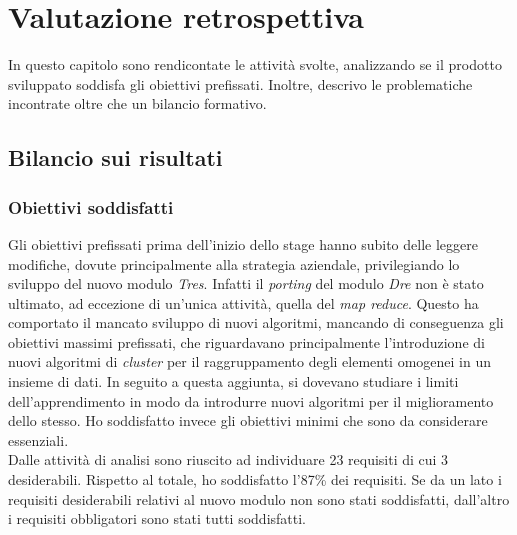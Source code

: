 
\chapter{Valutazione retrospettiva}
\label{cap:conclusioni}
In questo capitolo sono rendicontate le attività svolte, analizzando se il prodotto sviluppato soddisfa gli obiettivi prefissati. Inoltre, descrivo le problematiche incontrate oltre che un bilancio formativo.


\section{Bilancio sui risultati}

\subsection{Obiettivi soddisfatti}
Gli obiettivi prefissati prima dell'inizio dello stage hanno subito delle leggere modifiche, dovute principalmente alla strategia aziendale, privilegiando lo sviluppo del nuovo modulo \textit{Tres}. Infatti il \textit{porting} del modulo \textit{Dre} non è stato ultimato, ad eccezione di un'unica attività, quella del \textit{map reduce}. Questo ha comportato il mancato sviluppo di nuovi algoritmi, mancando di conseguenza gli obiettivi massimi prefissati, che riguardavano principalmente l'introduzione di nuovi algoritmi di \textit{cluster} per il raggruppamento degli elementi omogenei in un insieme di dati. In seguito a questa aggiunta, si dovevano studiare i limiti dell'apprendimento in modo da introdurre nuovi algoritmi per il miglioramento dello stesso.
Ho soddisfatto invece gli obiettivi minimi che sono da considerare essenziali.\\
Dalle attività di analisi sono riuscito ad individuare 23 requisiti di cui 3 desiderabili. Rispetto al totale, ho soddisfatto l'87\% dei requisiti. Se da un lato i requisiti desiderabili relativi al nuovo modulo non sono stati soddisfatti, dall'altro i requisiti obbligatori sono stati tutti soddisfatti.\\



